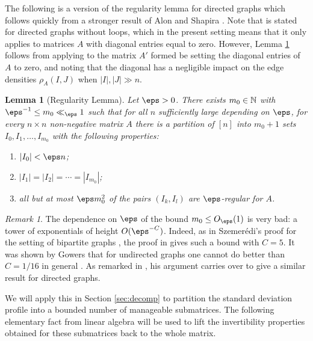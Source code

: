 \documentclass[aop,preprint]{imsart}
\theoremstyle{plain}
\newtheorem{lemma}[theorem]{Lemma}
\theoremstyle{definition}
\theoremstyle{remark}
\newtheorem{remark}[theorem]{Remark}
\numberwithin{equation}{section}
\numberwithin{theorem}{section}
\begin{document}
The following is a version of the regularity lemma for directed graphs which follows quickly from a stronger result of Alon and Shapira \cite[Lemma 3.1]{AlSh:testing}.
Note that \cite[Lemma 3.1]{AlSh:testing} is stated for directed graphs without loops, which in the present setting means that it only applies to matrices $A$ with diagonal entries equal to zero. 
However, Lemma \ref{lem:regularity} follows from applying \cite[Lemma 3.1]{AlSh:testing} to the matrix $A'$ formed be setting the diagonal entries of $A$ to zero, and noting that the diagonal has a negligible impact on the edge densities $\rho_A(I,J)$ when $|I|,|J|\gg n$. 

\begin{lemma}[Regularity Lemma] 	\label{lem:regularity}
Let $\eps>0$.
There exists $m_0\in {\mathbb N}$ with $\eps^{-1}\le m_0\ll_{\eps}1$ such that for all $n$ sufficiently large depending on $\eps$, for every $n\times n$ non-negative matrix $A$ there is a partition of $[n]$ into $m_0+1$ sets $I_0,I_1,\dots, I_{m_0}$ with the following properties:
\begin{enumerate}[(1)]
\item $|I_0|<\eps n$;
\item $|I_1|=|I_2|=\cdots =|I_{m_0}|$;
\item all but at most $\eps m_0^2$ of the pairs $(I_k,I_l)$ are $\eps$-regular for $A$. 
\end{enumerate}
\end{lemma}

\begin{remark}
The dependence on $\eps$ of the bound $m_0\le O_{\eps}(1)$ is very bad: a tower of exponentials of height $O(\eps^{-C})$. 
Indeed, as in Szemer\'edi's proof for the setting of bipartite graphs \citep{Szemeredi:lemma}, the proof in \citep{AlSh:testing} gives such a bound with $C=5$.
It was shown by Gowers that for undirected graphs one cannot do better than $C=1/16$ in general \citep{Gowers:towers}. 
As remarked in \citep{AlSh:testing}, his argument carries over to give a similar result for directed graphs. 
\end{remark}

We will apply this in Section \ref{sec:decomp} to partition the standard deviation profile into a bounded number of manageable submatrices. %
The following elementary fact from linear algebra will be used to lift the invertibility properties obtained for these submatrices back to the whole matrix.
\end{document}
